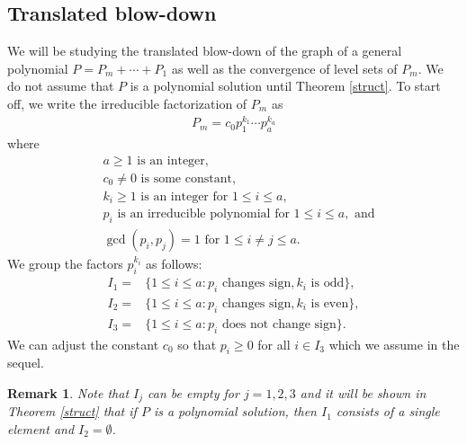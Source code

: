\documentclass[pdflatex,sn-mathphys-num]{sn-jnl}%
\theoremstyle{thmstyleone}%
\theoremstyle{thmstyletwo}%
\newtheorem{remark}{Remark}%
\theoremstyle{thmstylethree}%
\begin{document}
\subsection{Translated blow-down}
We will be studying the translated blow-down of the graph of a general polynomial $P=P_m+\cdots+P_1$ as well as the convergence of level sets of $P_m$. We do not assume that $P$ is a polynomial solution until Theorem \ref{struct}. To start off, we write the irreducible factorization of $P_m$ as 
\begin{align}\label{factor}
	P_m=c_0p_{1}^{k_1}\cdots p_a^{k_a}
\end{align} 
where
\[\begin{aligned}
	&a\ge 1 \text{ is an integer},\\
	&c_0\neq0\text{ is} \text{ some constant},\\
	&k_i\ge 1 \text{ is an integer for }1\le i\le a,\\
	&p_i\text{ is an irreducible polynomial for } 1\le i\le a,\text{ and}\\
	&\gcd(p_i,p_j)=1 \text { for }1\le i\neq j\le a.
\end{aligned}\]
We group the factors $p_i^{k_i}$ as follows:
\begin{equation}\label{cond}
	\begin{aligned}
		I_1=&\{1\le i\le a:p_i\text{ changes sign}, k_i\text{ is odd}\} ,\\
		I_2=&\{1\le i\le a:p_i\text{ changes sign}, k_i\text{ is even}\},\\
		I_3=&\{1\le i\le a:p_i\text{ does not change sign}\}.
	\end{aligned}
\end{equation}
We can adjust the constant $c_0$ so that $p_i\ge0$ for all $i\in I_3$ which we assume in the sequel.
\begin{remark}
	Note that $I_j$ can be empty for $j=1,2,3$ and it will be shown in Theorem \ref{struct} that if $P$ is a polynomial solution, then $I_1$ consists of a single element and $I_2=\emptyset$.
\end{remark}
\end{document}
